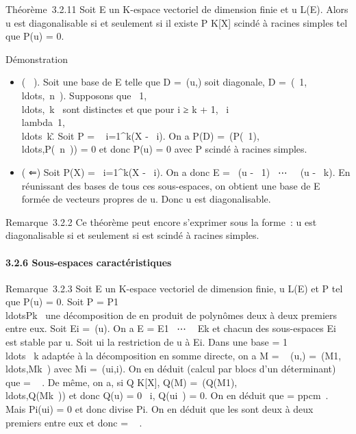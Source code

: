 Théorème~3.2.11 Soit E un K-espace vectoriel de dimension finie et u \in
L(E). Alors u est diagonalisable si et seulement si il existe P \in
K{[}X{]} scindé à racines simples tel que P(u) = 0.

Démonstration

\begin{itemize}
\itemsep1pt\parskip0pt
\item
  ( \rigtharrow~). Soit  une base de E telle que D =\
  \mathrmMat (u,) soit diagonale, D
  =\
  \mathrmdiag(\lambda~1,\\ldots,\lambda~n~).
  Supposons que
  \lambda~1,\\ldots,\lambda~k~
  sont distinctes et que pour i ≥ k + 1, \lambda~i
  \in\\lambda~1,\\ldots\lambda~k\~.
  Soit P = \∏ ~
  i=1^k(X - \lambda~i). On a P(D)
  =\
  \mathrmdiag(P(\lambda~1),\\ldots,P(\lambda~n~))
  = 0 et donc P(u) = 0 avec P scindé à racines simples.
\item
  ( ⇐) Soit P(X) =\ \∏
   i=1^k(X - \lambda~i). On a donc E
  = \mathrmKer~(u -
  \lambda~1\mathrmId)
  \oplus~⋯
  \oplus~\mathrmKer~(u -
  \lambda~k\mathrmId). En réunissant des bases de
  tous ces sous-espaces, on obtient une base de E formée de vecteurs
  propres de u. Donc u est diagonalisable.
\end{itemize}

Remarque~3.2.2 Ce théorème peut encore s'exprimer sous la forme~: u est
diagonalisable si et seulement si \muu est scindé à racines
simples.

\paragraph{3.2.6 Sous-espaces caractéristiques}

Remarque~3.2.3 Soit E un K-espace vectoriel de dimension finie, u \in L(E)
et P tel que P(u) = 0. Soit P =
P1\\ldotsPk~
une décomposition de \chiu en produit de polynômes deux à deux
premiers entre eux. Soit Ei =\
\mathrmKerPi(u). On a E = E1
\oplus~⋯ \oplus~ Ek et chacun des sous-espaces
Ei est stable par u. Soit ui la restriction de u à
Ei. Dans une base  = \mathcal{E}1
\cup\\ldots~
\cup\mathcal{E}k adaptée à la décomposition en somme directe, on a M
= \mathrmMat~ (u,)
=\
\mathrmdiag(M1,\\ldots,Mk~)
avec Mi =\
\mathrmMat (ui,\mathcal{E}i). On en
déduit (calcul par blocs d'un déterminant) que \chiu
= \∏ ~
\chiui. De même, on a, si Q \in K{[}X{]}, Q(M)
=\
\mathrmdiag(Q(M1),\\ldots,Q(Mk~))
et donc Q(u) = 0 \Leftrightarrow
\forall~i, Q(ui~) = 0. On en déduit que
\muu = ppcm\muui~.
Mais Pi(ui) = 0 et donc \muui
divise Pi. On en déduit que les \muui sont
deux à deux premiers entre eux et donc \muu
= \∏ ~
\muui.

